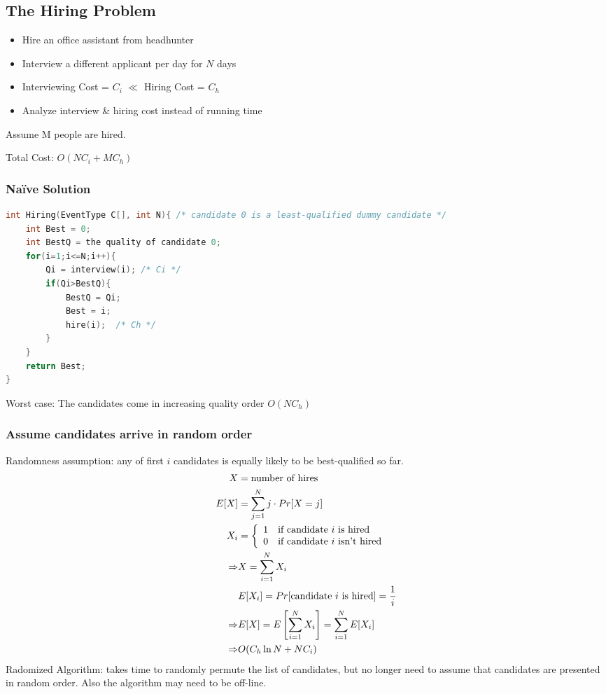 \documentclass{article}
\begin{document}
\subsection{The Hiring Problem}
\begin{itemize}
    \item Hire an office assistant from headhunter 
    \item Interview a different applicant per day for $N$ days
    \item Interviewing Cost = $C_i$  $\ll$  Hiring Cost = $C_h$
    \item Analyze interview \& hiring cost instead of running time
\end{itemize}
Assume M people are hired.  

Total Cost: $O(NC_i + MC_h)$

\subsubsection{Naïve Solution}
\begin{lstlisting}[language={c}]
int Hiring(EventType C[], int N){ /* candidate 0 is a least-qualified dummy candidate */  
    int Best = 0;
    int BestQ = the quality of candidate 0;
    for(i=1;i<=N;i++){
        Qi = interview(i); /* Ci */
        if(Qi>BestQ){
            BestQ = Qi;
            Best = i;
            hire(i);  /* Ch */
        }
    }
    return Best;
}
\end{lstlisting}
Worst case: The candidates come in increasing quality order $O(NC_h)$

\subsubsection{Assume candidates arrive in random order}
Randomness assumption: any of first $i$ candidates is equally likely to be best-qualified so far. 
\begin{align*}
    X &= \text{number of hires}\\
    E[X]&=\sum_{j=1}^N j\cdot Pr[X=j]\\
    X_i&=\left\{ \begin{array}[c]{ll}
        1 & \text{if candidate $i$ is hired}\\
        0 & \text{if candidate $i$ isn't hired}
    \end{array} \right.\\
    \Rightarrow&X=\sum_{i=1}^N X_i \\
    & E[X_i]=Pr[\text{candidate $i$ is hired}]=\frac{1}{i}\\
    \Rightarrow&E[X]=E\left[ \sum_{i=1}^NX_i \right]=\sum_{i=1}^N E[X_i]\\
    \Rightarrow& O(C_h \ln N + N C_i)
\end{align*}
Radomized Algorithm: takes time to randomly permute the list of candidates, but no longer need to assume that candidates are presented in random order. Also the algorithm may need to be off-line.
\end{document}
